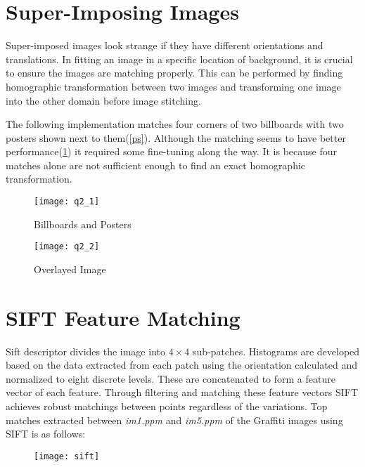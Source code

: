 \section{Super-Imposing Images}
Super-imposed images look strange if they have different orientations and translations. In fitting an image in a specific location of background, it is crucial to ensure the images are matching properly.  This can be performed by finding homographic transformation between two images and transforming one image into the other domain before image stitching.
\par
The following implementation matches four corners of two billboards with two posters shown next to them(\ref{ps}).  Although the matching seems to have better performance(\ref{rst_1}) it required some fine-tuning along the way. It is because four matches alone are not sufficient enough to find an exact homographic transformation.

\begin{figure}[h]
    \begin{center}
        \begin{minipage}{.65\textwidth}
            \texttt{[image: q2\_1]}
            \caption{Billboards and Posters}
            \label{ps}
        \end{minipage}
        \begin{minipage}{.65\textwidth}
            \texttt{[image: q2\_2]}
            \caption{Overlayed Image}
            \label{rst_1}
        \end{minipage}
    \end{center}
\end{figure}


\section{SIFT Feature Matching}
Sift descriptor divides the image into $4\times 4$ sub-patches. Histograms are developed based on the data extracted from each patch using the orientation calculated and normalized to eight discrete levels. These are concatenated to form a feature vector of each feature. Through filtering and matching these feature vectors SIFT achieves robust matchings between points regardless of the variations. Top matches extracted between \textit{im1.ppm} and \textit{im5.ppm} of the Graffiti  images using SIFT is as follows:
\begin{figure}[h]
    \begin{center}
        \texttt{[image: sift]}
    \end{center}
\end{figure}